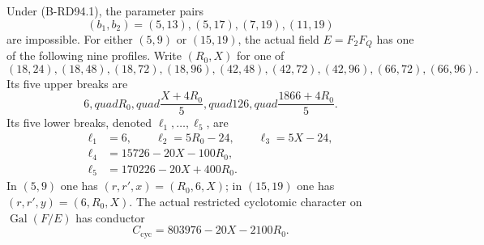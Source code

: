 \begin{proposition}
\label{prop:B-RD94-profiles}
Under (B-RD94.1), the parameter pairs
\[
             (b_1,b_2)=(5,13),(5,17),(7,19),(11,19)   \tag{B-RD94.14}
\]
are impossible. For either $(5,9)$ or $(15,19)$, the actual field
$E=F_2F_Q$ has one of the following nine profiles. Write $(R_0,X)$
for one of
\[
 (18,24),(18,48),(18,72),(18,96),
 (42,48),(42,72),(42,96),(66,72),(66,96).              \tag{B-RD94.15}
\]
Its five upper breaks are
\[
 6,quad R_0,quad\frac{X+4R_0}{5},quad126,quad
                   \frac{1866+4R_0}{5}.              \tag{B-RD94.16}
\]
Its five lower breaks, denoted $\ell_1,\ldots,\ell_5$, are
\[
\begin{split}
 \ell_1&=6,\qquad \ell_2=5R_0-24,\qquad\ell_3=5X-24,\\
 \ell_4&=15726-20X-100R_0,\\
 \ell_5&=170226-20X+400R_0.
\end{split}                                           \tag{B-RD94.17}
\]
In $(5,9)$ one has $(r,r',x)=(R_0,6,X)$; in $(15,19)$ one has
$(r,r',y)=(6,R_0,X)$. The actual restricted cyclotomic character
on $\operatorname{Gal}(F/E)$ has conductor
\[
                  C_{\mathrm{cyc}}=803976-20X-2100R_0.
                                                        \tag{B-RD94.18}
\]
\end{proposition}
